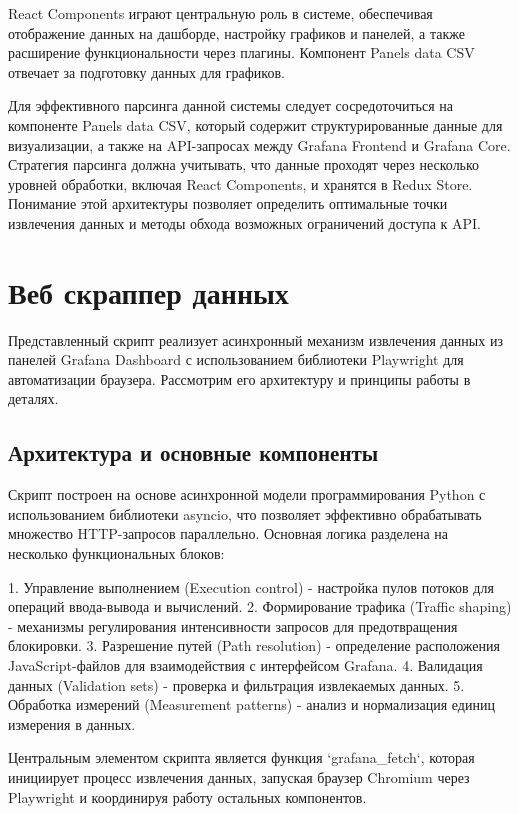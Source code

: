 React Components играют центральную роль в системе, обеспечивая отображение
данных на дашборде, настройку графиков и панелей, а также расширение
функциональности через плагины. Компонент Panels data CSV отвечает за
подготовку данных для графиков.

Для эффективного парсинга данной системы следует сосредоточиться на компоненте
Panels data CSV, который содержит структурированные данные для визуализации, а
также на API-запросах между Grafana Frontend и Grafana Core. Стратегия парсинга
должна учитывать, что данные проходят через несколько уровней обработки,
включая React Components, и хранятся в Redux Store. Понимание этой архитектуры
позволяет определить оптимальные точки извлечения данных и методы обхода
возможных ограничений доступа к API.

\section{Веб скраппер данных}

Представленный скрипт реализует асинхронный механизм извлечения данных из
панелей Grafana Dashboard с использованием библиотеки Playwright для
автоматизации браузера. Рассмотрим его архитектуру и принципы работы в деталях.

\subsection{Архитектура и основные компоненты}

Скрипт построен на основе асинхронной модели программирования Python с
использованием библиотеки asyncio, что позволяет эффективно обрабатывать
множество HTTP-запросов параллельно. Основная логика разделена на несколько
функциональных блоков:

1. Управление выполнением (Execution control) - настройка пулов потоков для
операций ввода-вывода и вычислений.
2. Формирование трафика (Traffic shaping) - механизмы регулирования
интенсивности запросов для предотвращения блокировки.
3. Разрешение путей (Path resolution) - определение расположения
JavaScript-файлов для взаимодействия с интерфейсом Grafana.
4. Валидация данных (Validation sets) - проверка и фильтрация извлекаемых
данных.
5. Обработка измерений (Measurement patterns) - анализ и нормализация единиц
измерения в данных.

Центральным элементом скрипта является функция `grafana\_fetch`, которая
инициирует процесс извлечения данных, запуская браузер Chromium через
Playwright и координируя работу остальных компонентов.

